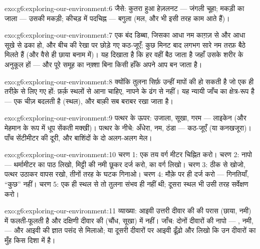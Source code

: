 \begin{solution}{exo:g6:exploring-our-environment:6}
जैसे: कुतरा हुआ हेज़लनट --- जंगली चूहा; मकड़ी का जाला --- उसकी मकड़ी;
कीचड़ में पदचिह्न --- बगुला (मल,  और  भी इसी तरह काम आते हैं)।
\end{solution}

\begin{solution}{exo:g6:exploring-our-environment:7}
एक बंद डिब्बा, जिसका आधा नम काग़ज़ से और आधा सूखे से ढका हो, और बीच की
रेखा पर छोड़े गए कठ-जूएँ; कुछ मिनट बाद लगभग सारे नम तरफ़ बैठे मिलते हैं
(और वैसे ही छाया बनाम  में)। यह दिखाता है कि हर  वहीं बैठ
जाता है जहाँ  उसके शरीर के अनुकूल हों --- और पूरे समूह का
नक़्शा बिना किसी हाँके अपने आप बन जाता है।
\end{solution}

\begin{solution}{exo:g6:exploring-our-environment:8}
क्योंकि तुलना सिर्फ़ उन्हीं मापों की हो सकती है जो एक ही तरीक़े से लिए
गए हों: फ़र्क़ स्थलों से आना चाहिए, नापने के ढंग से नहीं। यह न्यायी जाँच
का क्षेत्र-रूप है --- एक चीज़ बदलती है (स्थल), और बाक़ी सब बराबर रखा
जाता है।
\end{solution}

\begin{solution}{exo:g6:exploring-our-environment:9}
पत्थर के ऊपर: उजाला, सूखा, गरम --- लाइकेन (और मेहमान के रूप में धूप
सेंकती मक्खी)। पत्थर के नीचे: अँधेरा, नम, ठंडा --- कठ-जूएँ (या
कनखजूरा)। पाँच सेंटीमीटर की दूरी, और बाशिंदों के दो अलग-अलग मेल।
\end{solution}

\begin{solution}{exo:g6:exploring-our-environment:10}
चरण 1: एक तय वर्ग मीटर चिह्नित करो। चरण 2: नापो --- थर्मामीटर का पाठ
लिखो, मिट्टी की नमी छूकर दर्ज करो,  का वर्ग लिखो। चरण 3: ठीक से
खोजो, पत्थर उठाकर वापस रखो, तीनों तरह के घटक गिनाओ। चरण 4: मौक़े पर ही
दर्ज करो --- गिनतियाँ, ``कुछ'' नहीं। चरण 5: एक ही स्थल से तो तुलना
संभव ही नहीं थी; दूसरा स्थल भी उसी तरह सर्वेक्षण करो।
\end{solution}

\begin{solution}{exo:g6:exploring-our-environment:11}
व्याख्या: आइवी उत्तरी दीवार की  की परास (छाया, नमी) में
फलती-फूलती है और दक्षिणी दीवार की (चौंध, सूखा) में नहीं। जाँच: दोनों
दीवारों की  नापो --- , नमी,  --- और आइवी की ज्ञात पसंद
से मिलाओ; या दूसरी दीवारों पर आइवी ढूँढ़ो और लिखो कि उन दीवारों का मुँह
किस दिशा में है।
\end{solution}

